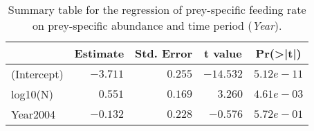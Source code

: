 \begin{table}[!htbp]
\caption{Summary table for the regression of prey-specific feeding rate 
  on prey-specific abundance and time period (\emph{Year}).\label{tab:FNY}} 
\begin{center}
\begin{tabular}{lrrrr}
\hline
\multicolumn{1}{l}{}&\multicolumn{1}{c}{Estimate}&\multicolumn{1}{c}{Std. Error}&\multicolumn{1}{c}{t value}&\multicolumn{1}{c}{Pr(\textgreater |t|)}\tabularnewline
\hline
(Intercept)&$-3.711$&$0.255$&$-14.532$&$5.12e-11$\tabularnewline
log10(N)&$ 0.551$&$0.169$&$  3.260$&$4.61e-03$\tabularnewline
Year2004&$-0.132$&$0.228$&$ -0.576$&$5.72e-01$\tabularnewline
\hline
\end{tabular}\end{center}
\end{table}
